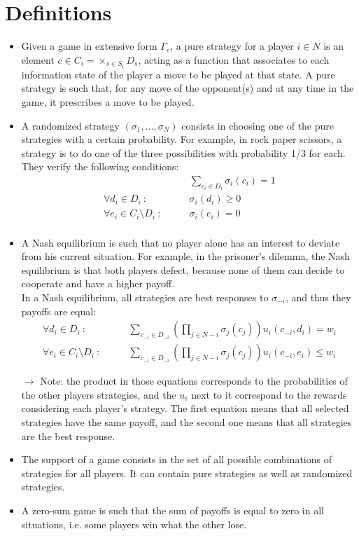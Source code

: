 \documentclass[12pt, openany]{report}
\theoremstyle{definition}
\begin{document}
\section{Definitions}
\begin{itemize}
	\item Given a game in extensive form $\Gamma_e$, a pure strategy for a player $i\in N$ is an element $c\in C_i = \times_{s\in S_i}D_s$, acting as a function that associates to each information state of the player a move to be played at that state. A pure strategy is such that, for any move of the opponent(s) and at any time in the game, it prescribes a move to be played.
	\item A randomized strategy $(\sigma_1,\dots, \sigma_N)$ consists in choosing one of the pure strategies with a certain probability. For example, in rock paper scissors, a strategy is to do one of the three possibilities with probability 1/3 for each.\\
	They verify the following conditions:
	\begin{equation}
		\begin{aligned}
			&\sum_{c_i\in D_i}\sigma_i(c_i)=1\\
			\forall d_i\in D_i\ :\qquad &\sigma_i(d_i)\ge 0\\
			\forall e_i\in C_i\setminus D_i\ : \qquad &\sigma_i(e_i)=0\\
		\end{aligned}
	\end{equation}
	\item A Nash equilibrium is such that no player alone has an interest to deviate from his current situation. For example, in the prisoner's dilemma, the Nash equilibrium is that both players defect, because none of them can decide to cooperate and have a higher payoff.\\
	In a Nash equilibrium, all strategies are best responses to $\sigma_{-i}$, and thus they payoffs are equal:
	\begin{equation}
		\begin{aligned}
			\forall d_i\in D_i\ : \qquad &\sum_{c_{-i}\in D_{-i}} \left(\prod_{j\in N-i}\sigma_j(c_j)\right) u_i(c_{-i},d_i)=w_i\\
			\forall e_i\in C_i\setminus D_i\ : \qquad &\sum_{c_{-i}\in D_{-i}} \left(\prod_{j\in N-i}\sigma_j(c_j)\right) u_i(c_{-i},e_i)\le w_i
		\end{aligned}
	\end{equation}
	\item [$\to$] Note: the product in those equations corresponds to the probabilities of the other players strategies, and the $u_i$ next to it correspond to the rewards considering each player's strategy. The first equation means that all selected strategies have the same payoff, and the second one means that all strategies are the best response. 
	\item The support of a game consists in the set of all possible combinations of strategies for all players. It can contain pure strategies as well as randomized strategies. 
	\item A zero-sum game is such that the sum of payoffs is equal to zero in all situations, i.e. some players win what the other lose.
\end{itemize}
\end{document}
